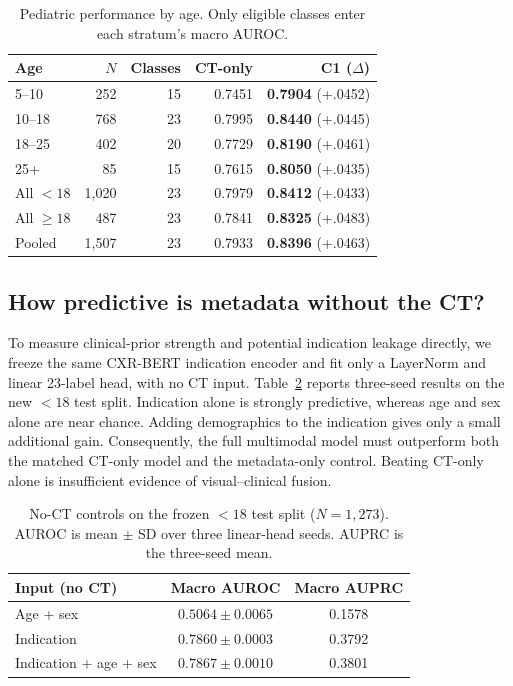 \documentclass[10pt,twocolumn]{article}
\newcommand{\best}[1]{\textbf{#1}}
\begin{document}
\begin{table}[t]
\centering
\caption{Pediatric performance by age. Only eligible classes enter each
stratum's macro AUROC.}
\label{tab:age}
\begin{tabular}{@{}lrrrr@{}}
\toprule
Age & $N$ & Classes & CT-only & C1 ($\Delta$) \\
\midrule
5--10 & 252 & 15 & 0.7451 & \best{0.7904} (+.0452) \\
10--18 & 768 & 23 & 0.7995 & \best{0.8440} (+.0445) \\
18--25 & 402 & 20 & 0.7729 & \best{0.8190} (+.0461) \\
25+ & 85 & 15 & 0.7615 & \best{0.8050} (+.0435) \\
All $<18$ & 1,020 & 23 & 0.7979 & \best{0.8412} (+.0433) \\
All $\geq18$ & 487 & 23 & 0.7841 & \best{0.8325} (+.0483) \\
\midrule
Pooled & 1,507 & 23 & 0.7933 & \best{0.8396} (+.0463) \\
\bottomrule
\end{tabular}
\end{table}

\subsection{How predictive is metadata without the CT?}
To measure clinical-prior strength and potential indication leakage directly,
we freeze the same CXR-BERT indication encoder and fit only a LayerNorm and
linear 23-label head, with no CT input. Table~\ref{tab:metadata-only} reports
three-seed results on the new $<18$ test split. Indication alone is strongly
predictive, whereas age and sex alone are near chance. Adding demographics to
the indication gives only a small additional gain. Consequently, the full
multimodal model must outperform both the matched CT-only model and the
metadata-only control. Beating CT-only alone is insufficient evidence of
visual--clinical fusion.

\begin{table}[t]
\centering
\caption{No-CT controls on the frozen $<18$ test split ($N=1,273$). AUROC is
mean $\pm$ SD over three linear-head seeds. AUPRC is the three-seed mean.}
\label{tab:metadata-only}
\begin{tabular}{@{}lcc@{}}
\toprule
Input (no CT) & Macro AUROC & Macro AUPRC \\
\midrule
Age + sex & $0.5064\pm0.0065$ & 0.1578 \\
Indication & $0.7860\pm0.0003$ & 0.3792 \\
Indication + age + sex & $0.7867\pm0.0010$ & 0.3801 \\
\bottomrule
\end{tabular}
\end{table}
\end{document}
